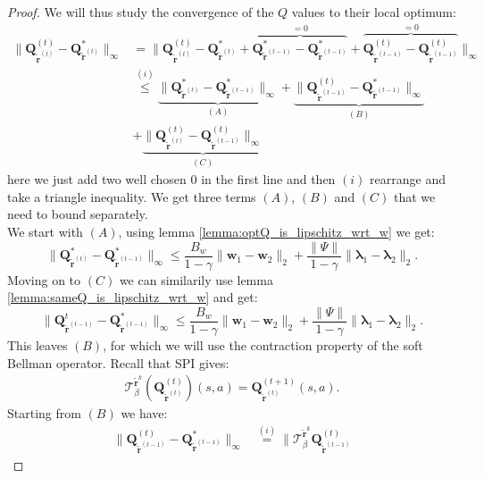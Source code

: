 \begin{proof}
We will thus study the convergence of the $Q$ values to their local optimum:
\begin{align*}
    \|\bm{Q}^{(t)}_{\tilde{\bm{r}}^{(t)}}- \bm{Q}^*_{\tilde{\bm{r}}^{(t)}} \|_\infty 
    &=
    \| \bm{Q}^{(t)}_{\tilde{\bm{r}}^{(t)}}- \bm{Q}^*_{\tilde{\bm{r}}^{(t)}}  +
    \overbrace{\bm{Q}^*_{\tilde{\bm{r}}^{(t-1)}} - \bm{Q}^*_{\tilde{\bm{r}}^{(t-1)}}}^{=0}
    +
    \overbrace{\bm{Q}^{(t)}_{\tilde{\bm{r}}^{(t-1)}} - \bm{Q}^{(t)}_{\tilde{\bm{r}}^{(t-1)}}}^{=0}
    \|_\infty  \\
    &\stackrel{(i)}{\leq} 
    \underbrace{\|  \bm{Q}^*_{\tilde{\bm{r}}^{(t)}} 
    - \bm{Q}^*_{\tilde{\bm{r}}^{(t-1)}} 
    \|_\infty  }_{(A)}
    +
    \underbrace{\|  \bm{Q}^{(t)}_{\tilde{\bm{r}}^{(t-1)}} 
    - \bm{Q}^*_{\tilde{\bm{r}}^{(t-1)}} 
    \|_\infty  }_{(B)} \\ &
    +
    \underbrace{\|  \bm{Q}^{(t)}_{\tilde{\bm{r}}^{(t)}}
    - \bm{Q}^{(t)}_{\tilde{\bm{r}}^{(t-1)}} 
    \|_\infty  }_{(C)}
\end{align*}
here we just add two well chosen $0$ in the first line and then $(i)$ rearrange and take a triangle inequality. We get three terms $(A)$, $(B)$ and $(C)$ that we need to bound separately. \\
\noindent
We start with $(A)$, using lemma \ref{lemma:optQ_is_lipschitz_wrt_w} we get:
\[
    \|  \bm{Q}^*_{\tilde{\bm{r}}^{(t)}} 
    - \bm{Q}^*_{\tilde{\bm{r}}^{(t-1)}} 
    \|_\infty 
    \leq \frac{B_w}{1 - \gamma} \| \bm{w}_1 - \bm{w}_2 \|_2 + \frac{\|\Psi\|}{1 - \gamma} \| \bm{\lambda}_1 - \bm{\lambda}_2 \|_2.
\]
Moving on to $(C)$ we can similarily use lemma \ref{lemma:sameQ_is_lipschitz_wrt_w} and get:
\[
    \| \bm{Q}^{t}_{\tilde{\bm{r}}^{(t-1)}} 
    - \bm{Q}^*_{\tilde{\bm{r}}^{(t-1)}} 
    \|_\infty   
    \leq \frac{B_w}{1 - \gamma} \| \bm{w}_1 - \bm{w}_2 \|_2 + \frac{\|\Psi\|}{1 - \gamma} \| \bm{\lambda}_1 - \bm{\lambda}_2 \|_2.
\]
This leaves $(B)$, for which we will use the contraction property of the soft Bellman operator. Recall that SPI gives:
\begin{align*}
    \mathcal{T}^{\tilde{\bm{r}}^{k}}_\beta (\bm{Q}^{(t)}_{\tilde{\bm{r}}^{(t)}}  ) (s,a)
    = \bm{Q}^{(t+1)}_{\tilde{\bm{r}}^{(t)}}  (s,a). \tag{SPI-T}
\end{align*}
Starting from $(B)$ we have:
\begin{align*}
    \|  \bm{Q}^{(t)}_{\tilde{\bm{r}}^{(t-1)}} 
    - \bm{Q}^*_{\tilde{\bm{r}}^{(t-1)}} 
    \|_\infty 
    & \stackrel{(i)}{=} 
    \|  
    \mathcal{T}^{\tilde{\bm{r}}^{k}}_\beta \bm{Q}^{(t)}_{\tilde{\bm{r}}^{(t-1)}}  

\end{align*}
\end{proof}
